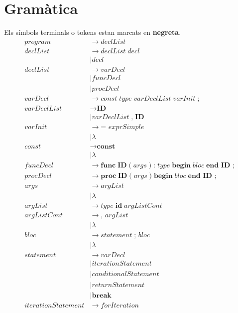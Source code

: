 \documentclass{article}
\begin{document}
\section{Gramàtica}
Els símbols terminals o tokens estan marcats en \textbf{negreta}. 
\begin{align*}
		program &\rightarrow declList 	\\
		declList &\rightarrow declList \; decl \\
				&\mid decl \\
		declList &\rightarrow varDecl \\
			&\mid funcDecl \\
			&\mid procDecl \\
		varDecl &\rightarrow const \; type \; varDeclList \; varInit \; \textbf{;} \\
		varDeclList &\rightarrow \textbf{ID} \\
			&\mid varDeclList \; \textbf{,} \; \textbf{ID} \\
		varInit &\rightarrow \textbf{= } exprSimple \\
			&\mid \lambda \\
		const &\rightarrow \textbf{const} \\
			&\mid \lambda \\
		funcDecl &\rightarrow \textbf{func} \; \textbf{ID} \; \textbf{(} \; args \; \textbf{)} \; \textbf{:} \; type \; \textbf{begin} \; bloc \; \textbf{end } \textbf{ID ;} \\
		procDecl &\rightarrow \textbf{proc} \; \textbf{ID} \; \textbf{(} \; args \; \textbf{)} \; \textbf{begin} \; bloc \; \textbf{end } \textbf{ID ;} \\
		args &\rightarrow argList \\
			&\mid \lambda \\
		argList &\rightarrow type \; \textbf{id} \; argListCont \\
		argListCont &\rightarrow \textbf{, } argList \\
			&\mid \lambda \\
		bloc &\rightarrow statement \; \textbf{; } bloc \\
			&\mid \lambda \\
		statement &\rightarrow varDecl \\
			&\mid iterationStatement \\
			&\mid conditionalStatement \\
			&\mid returnStatement \\
			&\mid \textbf{break} \\
		iterationStatement &\rightarrow forIteration \\

\end{align*}
\end{document}
